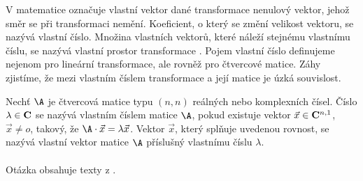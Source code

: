V matematice označuje vlastní vektor dané transformace nenulový vektor, jehož směr se při transformaci nemění. Koeficient, o který se změní velikost vektoru, se nazývá vlastní číslo. Množina vlastních vektorů, které náleží stejnému vlastnímu číslu, se nazývá vlastní prostor transformace \cite{wiki:vlastnicislo}. Pojem vlastní číslo definujeme nejenom pro lineární transformace, ale rovněž pro čtvercové matice. Záhy zjistíme, že mezi vlastním číslem transformace a její matice je úzká souvislost.

\noindent {} Nechť $\A$ je čtvercová matice typu $(n,n)$ reálných nebo komplexních čísel. Číslo $\lambda \in {\bf C}$ se nazývá  vlastním číslem matice $\A$, pokud existuje vektor $\vec x \in {\bf C}^{n,1}$, $\vec x \neq o$, takový, že $\A\cdot \vec x = \lambda \vec x$. Vektor $\vec x$, který splňuje uvedenou rovnost, se nazývá vlastní vektor matice $\A$ příslušný vlastnímu číslu $\lambda$.
\\
\\
Otázka obsahuje texty z \cite{algebra:kniha}.